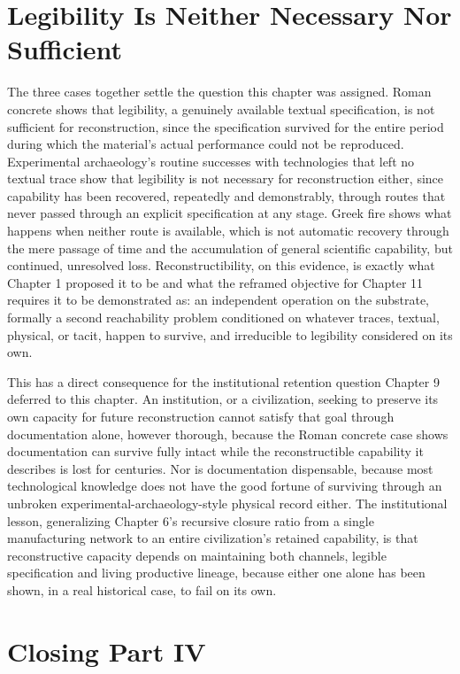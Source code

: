 \documentclass[11pt]{book}
\begin{document}
\section{Legibility Is Neither Necessary Nor Sufficient}

The three cases together settle the question this chapter was assigned. Roman concrete shows that legibility, a genuinely available textual specification, is not sufficient for reconstruction, since the specification survived for the entire period during which the material's actual performance could not be reproduced. Experimental archaeology's routine successes with technologies that left no textual trace show that legibility is not necessary for reconstruction either, since capability has been recovered, repeatedly and demonstrably, through routes that never passed through an explicit specification at any stage. Greek fire shows what happens when neither route is available, which is not automatic recovery through the mere passage of time and the accumulation of general scientific capability, but continued, unresolved loss. Reconstructibility, on this evidence, is exactly what Chapter 1 proposed it to be and what the reframed objective for Chapter 11 requires it to be demonstrated as: an independent operation on the substrate, formally a second reachability problem conditioned on whatever traces, textual, physical, or tacit, happen to survive, and irreducible to legibility considered on its own.

This has a direct consequence for the institutional retention question Chapter 9 deferred to this chapter. An institution, or a civilization, seeking to preserve its own capacity for future reconstruction cannot satisfy that goal through documentation alone, however thorough, because the Roman concrete case shows documentation can survive fully intact while the reconstructible capability it describes is lost for centuries. Nor is documentation dispensable, because most technological knowledge does not have the good fortune of surviving through an unbroken experimental-archaeology-style physical record either. The institutional lesson, generalizing Chapter 6's recursive closure ratio from a single manufacturing network to an entire civilization's retained capability, is that reconstructive capacity depends on maintaining both channels, legible specification and living productive lineage, because either one alone has been shown, in a real historical case, to fail on its own.

\section{Closing Part IV}
\end{document}
